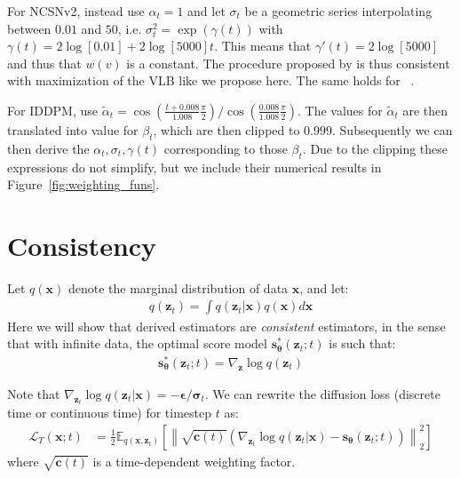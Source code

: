 \documentclass{article}
\def\rvc{{\mathbf{c}}}
\def\rvx{{\mathbf{x}}}
\def\rvz{{\mathbf{z}}}
\newcommand{\E}{\mathbb{E}}
\newcommand{\bT}{{\boldsymbol{\theta}}}
\newcommand{\snT}{\mathbf{s}_{\bT}}
\newcommand{\norm}[1]{\left\lVert#1\right\rVert}
\newcommand{\bepsilon}{{\boldsymbol{\epsilon}}}
\newcommand{\bsigma}{{\boldsymbol{\sigma}}}
\begin{document}
For NCSNv2, \cite{song2020improved} instead use $\alpha_t = 1$ and let $\sigma_{t}$ be a geometric series interpolating between $0.01$ and $50$, i.e. $\sigma^{2}_t = \exp(\gamma(t))$ with $\gamma(t)=2\log[0.01] + 2\log[5000]t$. This means that $\gamma'(t)=2\log[5000]$ and thus that $w(v)$ is a constant. The procedure proposed by \cite{song2020improved} is thus consistent with maximization of the VLB like we propose here. The same holds for ~\citep{song2019generative}.

For IDDPM, \cite{nichol2021improved} use $\tilde{\alpha}_{t} = \cos(\frac{t+0.008}{1.008}\frac{\pi}{2})/\cos(\frac{0.008}{1.008}\frac{\pi}{2})$. The values for $\tilde{\alpha}_{t}$ are then translated into value for $\beta_t$, which are then clipped to $0.999$. Subsequently we can then derive the $\alpha_{t},\sigma_t,\gamma(t)$ corresponding to those $\beta_t$. Due to the clipping these expressions do not simplify, but we include their numerical results in Figure~\ref{fig:weighting_funs}.


\section{Consistency}
\label{sec:dsm}

Let $q(\rvx)$ denote the marginal distribution of data $\rvx$, and let:
\begin{align}
    q(\rvz_t) = \int q(\rvz_t|\rvx) q(\rvx) d\rvx
\end{align}
Here we will show that derived estimators are \emph{consistent} estimators, in the sense that with infinite data, the optimal score model $\snT^*(\rvz_t;t)$ is such that:
\begin{align}
    \snT^*(\rvz_t;t) = \nabla_{\rvz} \log q(\rvz_t)
\end{align}

Note that $\nabla_{\rvz_t} \log q(\rvz_t|\rvx) = -\bepsilon/\bsigma_t$. We can rewrite the diffusion loss (discrete time or continuous time) for timestep $t$ as:
\begin{align}
\mathcal{L}_T(\rvx; t) &=
\frac{1}{2} 
\E_{q(\rvx,\rvz_t)} \left[
\norm{
\sqrt{\rvc(t)}
    \left(\nabla_{\rvz_t} \log q(\rvz_t|\rvx) - \snT(\rvz_t; t)\right)
}_2^2
\right]
\end{align}
where $\sqrt{\rvc(t)}$ is a time-dependent weighting factor. 
\end{document}
